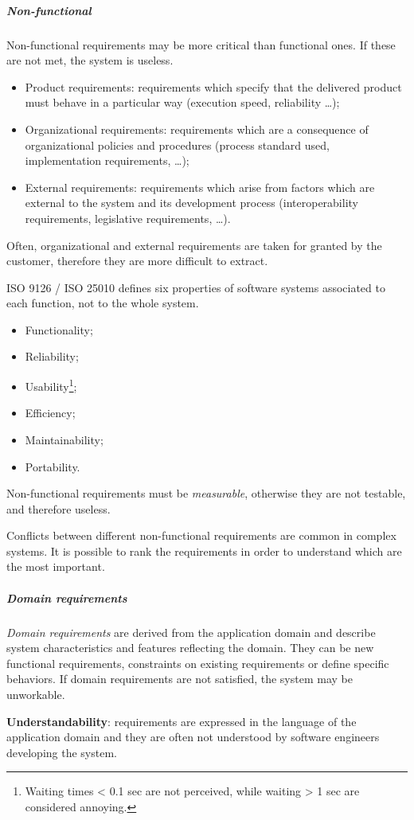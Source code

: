 \subparagraph{Non-functional}
Non-functional requirements may be more critical than functional ones. If these are not met, the system is useless.
\begin{itemize}
\item Product requirements: requirements which specify that the delivered product must behave in a particular way (execution speed, reliability \dots);
\item Organizational requirements: requirements which are a consequence of organizational policies and procedures (process standard used, implementation requirements, \dots);
\item External requirements: requirements which arise from factors which are external to the system and its development process (interoperability requirements, legislative requirements, \dots).
\end{itemize}
Often, organizational and external requirements are taken for granted by the customer, therefore they are more difficult to extract.

ISO 9126 / ISO 25010 defines six properties of software systems associated to each function, not to the whole system.
\begin{itemize}
\item Functionality;
\item Reliability;
\item Usability\footnote{Waiting times < 0.1 sec are not perceived, while waiting > 1 sec are considered annoying.};
\item Efficiency;
\item Maintainability;
\item Portability.
\end{itemize}

Non-functional requirements must be \emph{measurable}, otherwise they are not testable, and therefore useless.

Conflicts between different non-functional requirements are common in complex systems. It is possible to rank the requirements in order to understand which are the most important.

\subparagraph{Domain requirements}
\emph{Domain requirements} are derived from the application domain and describe system characteristics and features reflecting the domain. They can be new functional requirements, constraints on existing requirements or define specific behaviors. If domain requirements are not satisfied, the system may be unworkable.

\textbf{Understandability}: requirements are expressed in the language of the application domain and they are often not understood by software engineers developing the system.

